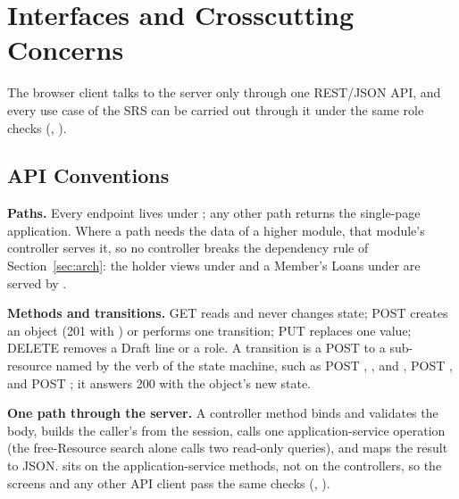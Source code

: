 \section{Interfaces and Crosscutting Concerns}\label{sec:api}\label{sec:cross}

The browser client talks to the server only through one REST/JSON API, and every use case of the SRS can be carried out through it under the same role checks (, ).

\subsection{API Conventions}

\textbf{Paths.} Every endpoint lives under ; any other path returns the single-page application. Where a path needs the data of a higher module, that module's controller serves it, so no controller breaks the dependency rule of Section~\ref{sec:arch}: the holder views under  and a Member's Loans under  are served by .

\textbf{Methods and transitions.} GET reads and never changes state; POST creates an object (201 with ) or performs one transition; PUT replaces one value; DELETE removes a Draft line or a role. A transition is a POST to a sub-resource named by the verb of the state machine, such as POST , , and , POST , and POST ; it answers 200 with the object's new state.

\textbf{One path through the server.} A controller method binds and validates the body, builds the caller's  from the session, calls one application-service operation (the free-Resource search alone calls two read-only queries), and maps the result to JSON.  sits on the application-service methods, not on the controllers, so the screens and any other API client pass the same checks (, ).

